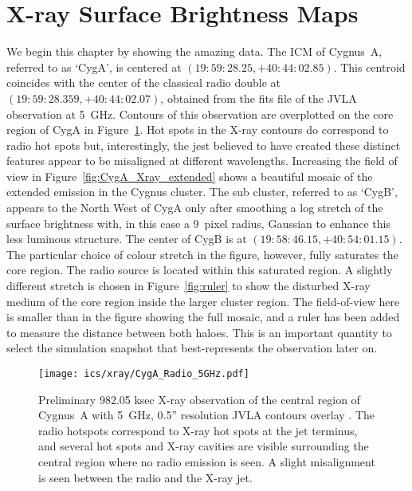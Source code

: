 \documentclass[MScProj_TLRH_ClusterEnergy.tex]{subfiles}
\begin{document}

\section{X-ray Surface Brightness Maps}
\label{sec:xray}
We begin this chapter by showing the amazing data. The ICM of Cygnus~A, referred
to as `CygA', is centered at $(19:59:28.25,+40:44:02.85)$. This centroid 
coincides with the center of the classical radio double at $(19:59:28.359, 
+40:44:02.07)$, obtained from the fits file of the \citet{1996A&ARv...7....1C}
JVLA observation at 5~GHz. Contours of this observation are overplotted on
the core region of CygA in Figure~\ref{fig:CygA_Xray}. Hot spots in the X-ray
contours do correspond to radio hot spots but, interestingly, the jest believed
to have created these distinct features appear to be misaligned at different
wavelengths. Increasing the field of view in Figure~\ref{fig:CygA_Xray_extended}
shows a beautiful mosaic of the extended emission in the Cygnus cluster. The
sub cluster, referred to as `CygB', appears to the North West of CygA only
after smoothing a log stretch of the surface brightness with, in this case a
$9$~pixel radius, Gaussian to enhance this less luminous structure. The center
of CygB is at $(19:58:46.15,+40:54:01.15)$. The particular choice of colour 
stretch in the figure, however, fully saturates the core region. The radio source
is located within this saturated region. A slightly different stretch is chosen
in Figure~\ref{fig:ruler} to show the disturbed X-ray medium of the core region
inside the larger cluster region. The field-of-view here is smaller than in the
figure showing the full mosaic, and a ruler has been added to measure the 
distance between both haloes. This is an important quantity to select the 
simulation snapshot that best-represents the observation later on.

\begin{figure}
\centering
\texttt{[image: ics/xray/CygA\_Radio\_5GHz.pdf]}
\caption{Preliminary 982.05 ksec  X-ray observation of the 
         central region of Cygnus~A \citep[in prep]{2016MNRAS.123..456W}
         with 5~GHz, 0.5'' resolution JVLA contours overlay
         \citep{1996A&ARv...7....1C}. The radio hotspots correspond to X-ray
         hot spots at the jet terminus, and several hot spots and X-ray cavities
         are visible surrounding the central region where no radio emission is
         seen. A slight misalignment is seen between the radio and the X-ray
         jet.
         }
\label{fig:CygA_Xray}
\end{figure}
\end{document}
